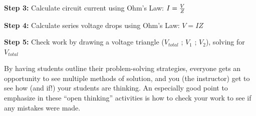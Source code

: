 {\bf Step 3:} Calculate circuit current using Ohm's Law: $I = {V \over Z}$

{\bf Step 4:} Calculate series voltage drops using Ohm's Law: $V = {I Z}$

{\bf Step 5:} Check work by drawing a voltage triangle ($V_{total}$ ; $V_1$ ; $V_2$), solving for $V_{total}$

\vskip 10pt

By having students outline their problem-solving strategies, everyone gets an opportunity to see multiple methods of solution, and you (the instructor) get to see how (and if!) your students are thinking.  An especially good point to emphasize in these ``open thinking'' activities is how to check your work to see if any mistakes were made.




